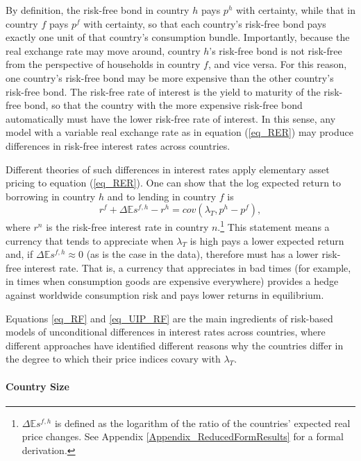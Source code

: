 By definition, the risk-free bond in country $h$ pays $p^h$ with
certainty, while that in country $f$ pays $p^f$ with certainty, so
that each country's risk-free bond pays exactly one unit of that
country's consumption bundle. Importantly, because the real exchange
rate may move around, country $h$'s risk-free bond is not risk-free
from the perspective of households in country $f$, and vice versa. For
this reason, one country's risk-free bond may be more expensive than
the other country's risk-free bond. The risk-free rate of interest is
the yield to maturity of the risk-free bond, so that the country with
the more expensive risk-free bond automatically must have the lower
risk-free rate of interest. In this sense, any model with a variable
real exchange rate as in equation (\ref{eq_RER}) may produce
differences in risk-free interest rates across countries.

Different theories of such differences in interest rates apply
elementary asset pricing to equation (\ref{eq_RER}). One can show that
the log expected return to borrowing in country $h$ and to lending in
country $f$ is
\begin{equation}
  r^{f} + \Delta \mathbb{E} s^{f,h} - r^{h} =cov\left( \lambda _{T},p^{h}-p^{f}\right),
  \label{eq_UIP_RF}
\end{equation}%
where $r^{n}$ is the risk-free interest rate in country
$n$.\footnote{$\Delta\mathbb{E}s^{f,h}$ is defined as the logarithm of
  the ratio of the countries' expected real price changes. See
  Appendix \ref{Appendix_ReducedFormResults} for a formal derivation.}
This statement means a currency that tends to appreciate when
$\lambda_T$ is high pays a lower expected return and, if
$\Delta \mathbb{E} s^{f,h}\approx0$ (as is the case in the data),
therefore must has a lower risk-free interest rate. That is, a
currency that appreciates in bad times (for example, in times when
consumption goods are expensive everywhere) provides a hedge against
worldwide consumption risk and pays lower returns in equilibrium.

Equations \eqref{eq_RF} and \eqref{eq_UIP_RF} are the main ingredients
of risk-based models of unconditional differences in interest rates
across countries, where different approaches have identified different
reasons why the countries differ in the degree to which their price
indices covary with $\lambda_T$.

\paragraph*{Country Size}




